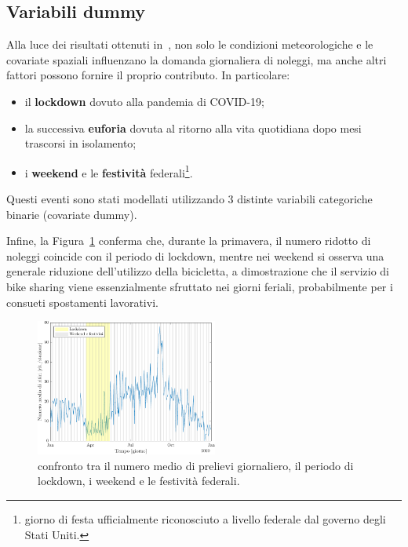 \subsection[Variabili dummy]{Variabili dummy}
Alla luce dei risultati ottenuti in~\cite{paper_bike_sharing_Otto}, non solo le condizioni meteorologiche e le covariate spaziali influenzano la domanda giornaliera di noleggi, ma anche altri fattori possono fornire il proprio contributo. In particolare:
\begin{itemize}
	\item il \textbf{lockdown} dovuto alla pandemia di COVID-\num{19};
	\item la successiva \textbf{euforia} dovuta al ritorno alla vita quotidiana dopo mesi trascorsi in isolamento;
	\item i \textbf{weekend} e le \textbf{festività} federali\footnote{giorno di festa ufficialmente riconosciuto a livello federale dal governo degli Stati Uniti.}.
\end{itemize}
Questi eventi sono stati modellati utilizzando \num{3} distinte variabili categoriche binarie (covariate dummy).
\par Infine, la Figura~\ref{ritiri_vs_dummy} conferma che, durante la primavera, il numero ridotto di noleggi coincide con il periodo di lockdown, mentre nei weekend si osserva una generale riduzione dell'utilizzo della bicicletta, a dimostrazione che il servizio di bike sharing viene essenzialmente sfruttato nei giorni feriali, probabilmente per i consueti spostamenti lavorativi.

\begin{figure}[htpb]
	\centering
	\includegraphics[height=170px]{Immagini/4. Caso di studio/Serie storiche/Ritiri giornalieri e dummy}
	\caption[Confronto tra il numero medio di prelievi giornaliero, il periodo di lockdown, i weekend e le festività federali]{confronto tra il numero medio di prelievi giornaliero, il periodo di lockdown, i weekend e le festività federali.}
	\label{ritiri_vs_dummy}
\end{figure}

